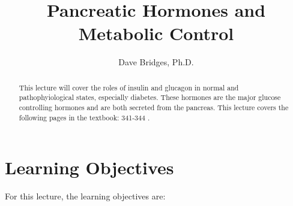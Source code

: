 \documentclass{tufte-handout}
\title{Pancreatic Hormones and Metabolic Control}
\author{Dave Bridges, Ph.D.}
\begin{document}
\maketitle%

\begin{abstract}
\noindent This lecture will cover the roles of insulin and glucagon in normal and pathophyiological states, especially diabetes.  These hormones are the major glucose controlling hormones and are both secreted from the pancreas.  This lecture covers the following pages in the textbook: 341-344 \cite{Widmaier2013}.  
\end{abstract}

\tableofcontents

\pagebreak

\section{Learning Objectives}
For this lecture, the learning objectives are:
\end{document}
